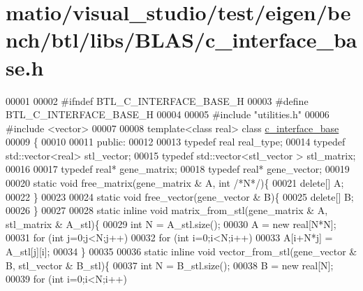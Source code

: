 \hypertarget{matio_2visual__studio_2test_2eigen_2bench_2btl_2libs_2_b_l_a_s_2c__interface__base_8h_source}{}\section{matio/visual\+\_\+studio/test/eigen/bench/btl/libs/\+B\+L\+A\+S/c\+\_\+interface\+\_\+base.h}
\label{matio_2visual__studio_2test_2eigen_2bench_2btl_2libs_2_b_l_a_s_2c__interface__base_8h_source}

\begin{DoxyCode}
00001 
00002 \textcolor{preprocessor}{#ifndef BTL\_C\_INTERFACE\_BASE\_H}
00003 \textcolor{preprocessor}{#define BTL\_C\_INTERFACE\_BASE\_H}
00004 
00005 \textcolor{preprocessor}{#include "utilities.h"}
00006 \textcolor{preprocessor}{#include <vector>}
00007 
00008 \textcolor{keyword}{template}<\textcolor{keyword}{class} real> \textcolor{keyword}{class }\hyperlink{classc__interface__base}{c\_interface\_base}
00009 \{
00010 
00011 \textcolor{keyword}{public}:
00012 
00013   \textcolor{keyword}{typedef} real                      real\_type;
00014   \textcolor{keyword}{typedef} std::vector<real>         stl\_vector;
00015   \textcolor{keyword}{typedef} std::vector<stl\_vector >  stl\_matrix;
00016 
00017   \textcolor{keyword}{typedef} real* gene\_matrix;
00018   \textcolor{keyword}{typedef} real* gene\_vector;
00019 
00020   \textcolor{keyword}{static} \textcolor{keywordtype}{void} free\_matrix(gene\_matrix & A, \textcolor{keywordtype}{int} \textcolor{comment}{/*N*/})\{
00021     \textcolor{keyword}{delete}[] A;
00022   \}
00023 
00024   \textcolor{keyword}{static} \textcolor{keywordtype}{void} free\_vector(gene\_vector & B)\{
00025     \textcolor{keyword}{delete}[] B;
00026   \}
00027 
00028   \textcolor{keyword}{static} \textcolor{keyword}{inline} \textcolor{keywordtype}{void} matrix\_from\_stl(gene\_matrix & A, stl\_matrix & A\_stl)\{
00029     \textcolor{keywordtype}{int} N = A\_stl.size();
00030     A = \textcolor{keyword}{new} real[N*N];
00031     \textcolor{keywordflow}{for} (\textcolor{keywordtype}{int} j=0;j<N;j++)
00032       \textcolor{keywordflow}{for} (\textcolor{keywordtype}{int} i=0;i<N;i++)
00033         A[i+N*j] = A\_stl[j][i];
00034   \}
00035 
00036   \textcolor{keyword}{static} \textcolor{keyword}{inline} \textcolor{keywordtype}{void} vector\_from\_stl(gene\_vector & B, stl\_vector & B\_stl)\{
00037     \textcolor{keywordtype}{int} N = B\_stl.size();
00038     B = \textcolor{keyword}{new} real[N];
00039     \textcolor{keywordflow}{for} (\textcolor{keywordtype}{int} i=0;i<N;i++)

\end{DoxyCode}
